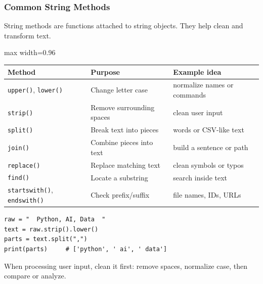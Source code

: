 \documentclass[aspectratio=169,10pt]{beamer}
\newcommand{\codeword}[1]{\texttt{#1}}
\begin{document}
\begin{frame}[fragile]
\frametitle{Common String Methods}
\small
String methods are functions attached to string objects. They help clean and transform text.

\vspace{-0.05cm}
\begin{adjustbox}{max width=0.96\textwidth}
\begin{tabular}{@{}lll@{}}
\toprule
\textbf{Method} & \textbf{Purpose} & \textbf{Example idea} \\
\midrule
\codeword{upper()}, \codeword{lower()} & Change letter case & normalize names or commands \\
\codeword{strip()} & Remove surrounding spaces & clean user input \\
\codeword{split()} & Break text into pieces & words or CSV-like text \\
\codeword{join()} & Combine pieces into text & build a sentence or path \\
\codeword{replace()} & Replace matching text & clean symbols or typos \\
\codeword{find()} & Locate a substring & search inside text \\
\codeword{startswith()}, \codeword{endswith()} & Check prefix/suffix & file names, IDs, URLs \\
\bottomrule
\end{tabular}
\end{adjustbox}

\vspace{0.15cm}
\begin{lstlisting}[style=pycode]
raw = "  Python, AI, Data  "
text = raw.strip().lower()
parts = text.split(",")
print(parts)     # ['python', ' ai', ' data']
\end{lstlisting}

\begin{tcolorbox}[lecturebox,title=Habit]
When processing user input, clean it first: remove spaces, normalize case, then compare or analyze.
\end{tcolorbox}
\end{frame}
\end{document}
